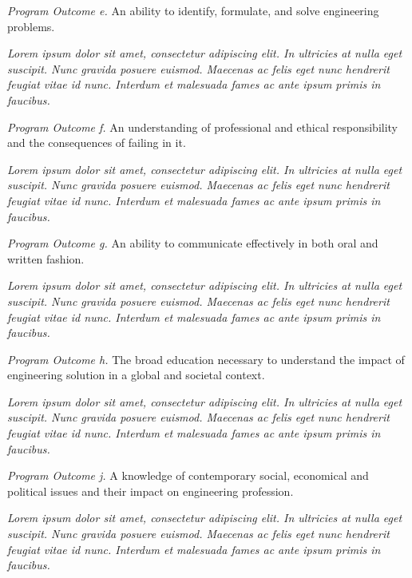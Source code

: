\documentclass[letterpaper]{kuthesis}
\begin{document}
\textit{Program Outcome e.}  An ability to identify, formulate, and solve engineering problems.
\begin{adjustwidth}{0.5in}{0in}
\textit{Lorem ipsum dolor sit amet, consectetur adipiscing elit. In ultricies at nulla eget suscipit. Nunc gravida posuere euismod. Maecenas ac felis eget nunc hendrerit feugiat vitae id nunc. Interdum et malesuada fames ac ante ipsum primis in faucibus. }\\
\end{adjustwidth} 
\textit{Program Outcome f.}  An understanding of professional and ethical responsibility and the consequences of failing in it.
\begin{adjustwidth}{0.5in}{0in}
\textit{Lorem ipsum dolor sit amet, consectetur adipiscing elit. In ultricies at nulla eget suscipit. Nunc gravida posuere euismod. Maecenas ac felis eget nunc hendrerit feugiat vitae id nunc. Interdum et malesuada fames ac ante ipsum primis in faucibus. }\\
\end{adjustwidth} 
\textit{Program Outcome g.}  An ability to communicate effectively in both oral and written fashion.
\begin{adjustwidth}{0.5in}{0in}
\textit{Lorem ipsum dolor sit amet, consectetur adipiscing elit. In ultricies at nulla eget suscipit. Nunc gravida posuere euismod. Maecenas ac felis eget nunc hendrerit feugiat vitae id nunc. Interdum et malesuada fames ac ante ipsum primis in faucibus. }\\
\end{adjustwidth} 
\textit{Program Outcome h.}  The broad education necessary to understand the impact of engineering solution in a global and societal context.
\begin{adjustwidth}{0.5in}{0in}
\textit{Lorem ipsum dolor sit amet, consectetur adipiscing elit. In ultricies at nulla eget suscipit. Nunc gravida posuere euismod. Maecenas ac felis eget nunc hendrerit feugiat vitae id nunc. Interdum et malesuada fames ac ante ipsum primis in faucibus. }\\
\end{adjustwidth} 
\textit{Program Outcome j.}  A knowledge of contemporary social, economical and political issues and their impact on engineering profession.
\begin{adjustwidth}{0.5in}{0in}
\textit{Lorem ipsum dolor sit amet, consectetur adipiscing elit. In ultricies at nulla eget suscipit. Nunc gravida posuere euismod. Maecenas ac felis eget nunc hendrerit feugiat vitae id nunc. Interdum et malesuada fames ac ante ipsum primis in faucibus. }\\
\end{adjustwidth}
\end{document}
